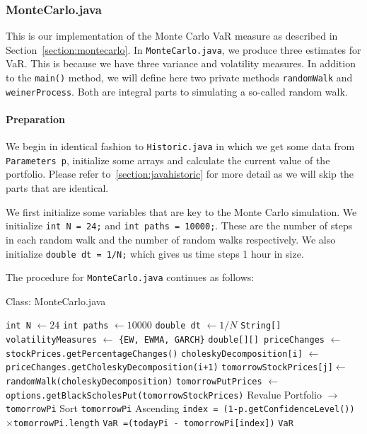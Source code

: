 \documentclass[../Dissertation.tex]{subfiles}
\begin{document}
\subsubsection{MonteCarlo.java}

This is our implementation of the Monte Carlo VaR measure as described in Section~\ref{section:montecarlo}.
In \lstinline|MonteCarlo.java|, we produce three estimates for VaR.
This is because we have three variance and volatility measures.
In addition to the \lstinline|main()| method, we will define here two private methods \lstinline|randomWalk| and \lstinline|weinerProcess|.
Both are integral parts to simulating a so-called random walk.

\paragraph{Preparation}

We begin in identical fashion to \lstinline|Historic.java| in which we get some data from \lstinline|Parameters p|, initialize some arrays and calculate the current value of the portfolio.
Please refer to~\ref{section:javahistoric} for more detail as we will skip the parts that are identical.

We first initialize some variables that are key to the Monte Carlo simulation.
We initialize \lstinline|int N = 24;| and \lstinline|int paths = 10000;|.
These are the number of steps in each random walk and the number of random walks respectively.
We also initialize \lstinline|double dt = 1/N;| which gives us time steps 1 hour in size.

The procedure for \lstinline|MonteCarlo.java| continues as follows:
					\begin{algorithm}[H]
						\caption{Class: MonteCarlo.java}
						\begin{algorithmic}[1]
						\label{class:MonteCarlo}									
						\State \lstinline|int N| $\gets 24$
						\State \lstinline|int paths| $\gets 10000$
						\State \lstinline|double dt| $\gets 1/N$
						\State \lstinline|String[] volatilityMeasures| $\gets$ \lstinline|{EW, EWMA, GARCH}|
						\State \lstinline|double[][] priceChanges| $\gets$ \lstinline|stockPrices.getPercentageChanges()|
							\State \lstinline|choleskyDecomposition[i]| $\gets$ \lstinline|priceChanges.getCholeskyDecomposition(i+1)|
								\State \lstinline|tomorrowStockPrices[j]|$\gets$\lstinline|randomWalk(choleskyDecomposition)|
							\EndFor
							\State \lstinline|tomorrowPutPrices| $\gets$ \lstinline|options.getBlackScholesPut(tomorrowStockPrices)|
							\State Revalue Portfolio $\to$ \lstinline|tomorrowPi|
							\State Sort \lstinline|tomorrowPi| Ascending
							\State \lstinline|index = (1-p.getConfidenceLevel())|$\times$\lstinline|tomorrowPi.length|
							\State \lstinline|VaR =(todayPi - tomorrowPi[index])|
						\EndFor 
						\State \Return \lstinline|VaR|						
						\EndFunction
						\end{algorithmic}
					\end{algorithm}
					
\end{document}
